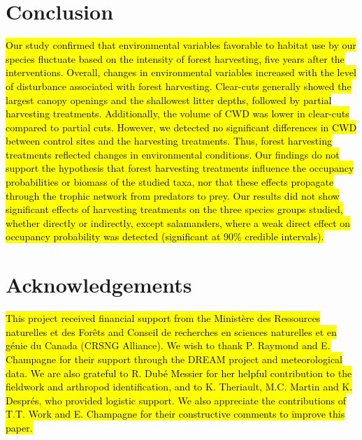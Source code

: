 
\section*{Conclusion}
\label{sec:conclu1}

\hl{Our study confirmed that environmental variables favorable to habitat use by our species fluctuate based on the intensity of forest harvesting, five years after the interventions. 
Overall, changes in environmental variables increased with the level of disturbance associated with forest harvesting. 
Clear-cuts generally showed the largest canopy openings and the shallowest litter depths, followed by partial harvesting treatments. 
Additionally, the volume of CWD was lower in clear-cuts compared to partial cuts. 
However, we detected no significant differences in CWD between control sites and the harvesting treatments. 
Thus, forest harvesting treatments reflected changes in environmental conditions. 
Our findings do not support the hypothesis that forest harvesting treatments influence the occupancy probabilities or biomass of the studied taxa, nor that these effects propagate through the trophic network from predators to prey. 
Our results did not show significant effects of harvesting treatments on the three species groups studied, whether directly or indirectly, 
except salamanders, where a weak direct effect on occupancy probability was detected (significant at 90\% credible intervals). }


\section*{Acknowledgements}
\label{sec:acknowl1}

\hl{This project received financial support from the Ministère des Ressources naturelles et des Forêts and Conseil de recherches en sciences naturelles et en génie du Canada (CRSNG Alliance). 
We wish to thank P. Raymond and E. Champagne for their support through the DREAM project and meteorological data. 
We are also grateful to R. Dubé Messier for her helpful contribution to the fieldwork and arthropod identification, and to K. Theriault, M.C. Martin and K. Després, who provided logistic support. 
We also appreciate the contributions of T.T. Work and E. Champagne for their constructive comments to improve this paper.}

